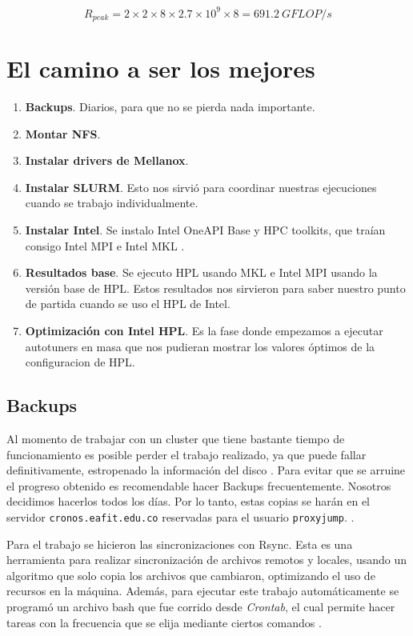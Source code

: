 \documentclass[conference,compsoc]{IEEEtran}
\begin{document}
\begin{equation} \label{rpeak_two_node}
	R_{peak} = 2 \times 2 \times 8 \times 2.7 \times 10^{9} \times 8 = 691.2\ {GFLOP}/s
\end{equation}

\section{El camino a ser los mejores}

\begin{enumerate}
	\item \textbf{Backups}. Diarios, para que no se pierda nada importante.
	\item \textbf{Montar NFS}.
	\item \textbf{Instalar drivers de Mellanox}.
	\item \textbf{Instalar SLURM}. Esto nos sirvió para coordinar nuestras ejecuciones cuando se trabajo individualmente.
	\item \textbf{Instalar Intel}. Se instalo Intel OneAPI \cite{intel-oneapi} Base y HPC toolkits, que traían consigo Intel MPI \cite{intel-mpi} e Intel MKL \cite{intel-mkl-blas}. 
	\item \textbf{Resultados base}. Se ejecuto HPL usando MKL e Intel MPI usando la versión base de HPL. Estos resultados nos sirvieron para saber nuestro punto de partida cuando se uso el HPL de Intel.
	\item \textbf{Optimización con Intel HPL}. Es la fase donde empezamos a ejecutar  autotuners en masa que nos pudieran mostrar los valores óptimos de la configuracion de HPL.
\end{enumerate}

\subsection{Backups}
Al momento de trabajar con un cluster que tiene bastante tiempo de funcionamiento es posible perder el trabajo realizado, ya que puede fallar definitivamente, estropenado la información del disco \cite{Meta-Volante-0}. Para evitar que se arruine el progreso obtenido es recomendable hacer Backups frecuentemente. Nosotros decidimos hacerlos todos los días. Por lo tanto, estas copias se harán en el servidor \verb|cronos.eafit.edu.co| reservadas para el usuario \verb|proxyjump|. \cite{Meta-Volante-0}.

Para el trabajo se hicieron las sincronizaciones con Rsync. Esta es una herramienta para realizar sincronización de archivos remotos y locales, usando un algoritmo que solo copia los archivos que cambiaron, optimizando el uso de recursos en la máquina. Además, para ejecutar este trabajo automáticamente se programó un archivo bash que fue corrido desde \textit{Crontab}, el cual permite hacer tareas con la frecuencia que se elija mediante ciertos comandos \cite{crontab}. 
\end{document}
